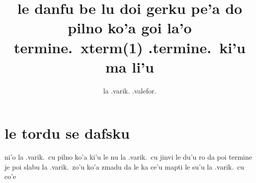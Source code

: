 \documentclass{article}
\title{le danfu be lu doi gerku pe'a do pilno ko'a goi la'o termine.\ xterm(1) .termine.\ ki'u ma li'u}
\author{la .varik. .valefor.}
\begin{document}
\maketitle

\section{le tordu se dafsku}
ni'o la .varik.\ cu pilno ko'a ki'u le nu la .varik.\ cu jinvi le du'u ro da poi termine je poi slabu la .varik.\ zo'u ko'a zmadu da le ka ce'u mapti le su'u la .varik.\ cu co'e
\end{document}
